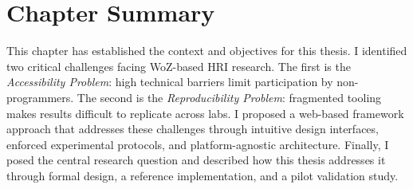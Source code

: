 \section{Chapter Summary}

This chapter has established the context and objectives for this thesis. I identified two critical challenges facing WoZ-based HRI research. The first is the \emph{Accessibility Problem}: high technical barriers limit participation by non-programmers. The second is the \emph{Reproducibility Problem}: fragmented tooling makes results difficult to replicate across labs. I proposed a web-based framework approach that addresses these challenges through intuitive design interfaces, enforced experimental protocols, and platform-agnostic architecture. Finally, I posed the central research question and described how this thesis addresses it through formal design, a reference implementation, and a pilot validation study.
